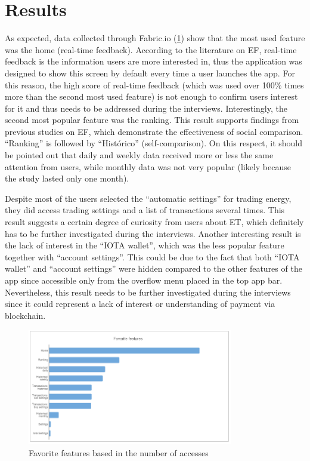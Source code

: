  \section{Results}
 As expected, data collected through Fabric.io (\cref{fig:gr1}) show that the most used feature was the home (real-time feedback). According to the literature on \ac{EF}, real-time feedback is the information users are more interested in, thus the application was designed to show this screen by default every time a user launches the app. For this reason, the high score of real-time feedback (which was used over 100\% times more than the second most used feature) is not enough to confirm users interest for it and thus needs to be addressed during the interviews. Interestingly, the second most popular feature was the ranking. This result supports findings from previous studies on \ac{EF}, which demonstrate the effectiveness of social comparison. “Ranking” is followed by  “Histórico” (self-comparison). On this respect, it should be pointed out that daily and weekly data received more or less the same attention from users, while monthly data was not very popular (likely because the study lasted only one month).


Despite most of the users selected the “automatic settings” for trading energy,  they did access trading settings and a list of transactions several times. This result suggests a certain degree of curiosity from users about \ac{ET}, which definitely has to be further investigated during the interviews. Another interesting result is the lack of interest in the “IOTA wallet”, which was the less popular feature together with “account settings”. This could be due to the fact that both “IOTA wallet” and “account settings” were hidden compared to the other features of the app since accessible only from the overflow menu placed in the top app bar. Nevertheless, this result needs to be further investigated during the interviews since it could represent a lack of interest or understanding of payment via blockchain. 

 
 \begin{figure}[h]
\centering
\includegraphics[width=0.8\textwidth]{./Images/graph1}
\caption{Favorite features based in the number of accesses}
\label{fig:gr1}
\end{figure}

